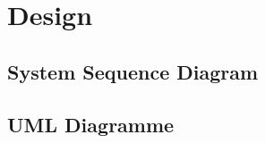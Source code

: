 \chapter{Design}
\label{chap:design}

\section{System Sequence Diagram}
\label{sec:system_sequence_diagram}

\section{UML Diagramme}
\label{sec:uml_diagramme}